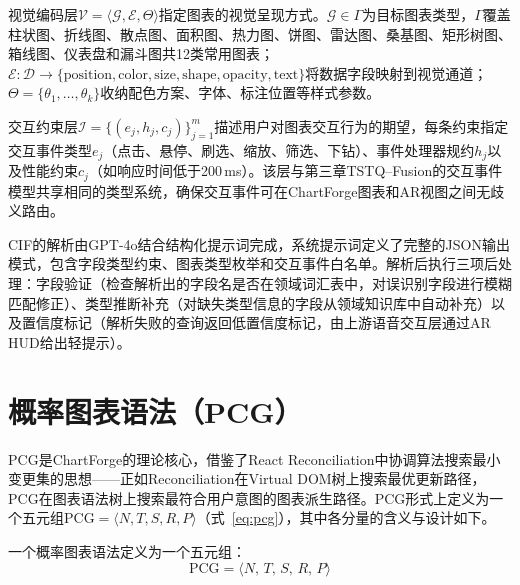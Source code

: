 视觉编码层$\mathcal{V} = \langle \mathcal{G}, \mathcal{E}, \Theta \rangle$指定图表的视觉呈现方式。$\mathcal{G} \in \Gamma$为目标图表类型，$\Gamma$覆盖柱状图、折线图、散点图、面积图、热力图、饼图、雷达图、桑基图、矩形树图、箱线图、仪表盘和漏斗图共12类常用图表；$\mathcal{E}: \mathcal{D} \to \{\text{position}, \text{color}, \text{size}, \text{shape}, \text{opacity}, \text{text}\}$将数据字段映射到视觉通道；$\Theta = \{\theta_1, \dots, \theta_k\}$收纳配色方案、字体、标注位置等样式参数。

交互约束层$\mathcal{I} = \big\{ (e_j, h_j, c_j) \big\}_{j=1}^{m}$描述用户对图表交互行为的期望，每条约束指定交互事件类型$e_j$（点击、悬停、刷选、缩放、筛选、下钻）、事件处理器规约$h_j$以及性能约束$c_j$（如响应时间低于200\,ms）。该层与第三章TSTQ--Fusion的交互事件模型共享相同的类型系统，确保交互事件可在ChartForge图表和AR视图之间无歧义路由。

CIF的解析由GPT-4o结合结构化提示词完成，系统提示词定义了完整的JSON输出模式，包含字段类型约束、图表类型枚举和交互事件白名单。解析后执行三项后处理：字段验证（检查解析出的字段名是否在领域词汇表中，对误识别字段进行模糊匹配修正）、类型推断补充（对缺失类型信息的字段从领域知识库中自动补充）以及置信度标记（解析失败的查询返回低置信度标记，由上游语音交互层通过AR HUD给出轻提示）。

\section{概率图表语法（PCG）}
\label{sec:pcg}

PCG是ChartForge的理论核心，借鉴了React Reconciliation中协调算法搜索最小变更集的思想——正如Reconciliation在Virtual DOM树上搜索最优更新路径，PCG在图表语法树上搜索最符合用户意图的图表派生路径。PCG形式上定义为一个五元组$\text{PCG} = \langle N, T, S, R, P \rangle$（式~\ref{eq:pcg}），其中各分量的含义与设计如下。

\begin{definition}[概率图表语法]
一个概率图表语法定义为一个五元组：
\begin{equation}\label{eq:pcg}
    \text{PCG} = \langle N,\, T,\, S,\, R,\, P \rangle
\end{equation}
\end{definition}

